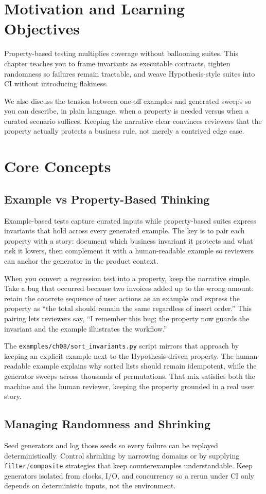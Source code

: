 \section{Motivation and Learning Objectives}
Property-based testing multiplies coverage without ballooning suites. This chapter teaches you to frame invariants as executable contracts, tighten randomness so failures remain tractable, and weave Hypothesis-style suites into CI without introducing flakiness.

We also discuss the tension between one-off examples and generated sweeps so you can describe, in plain language, when a property is needed versus when a curated scenario suffices. Keeping the narrative clear convinces reviewers that the property actually protects a business rule, not merely a contrived edge case.

\section{Core Concepts}
\subsection{Example vs Property-Based Thinking}
Example-based tests capture curated inputs while property-based suites express invariants that hold across every generated example. The key is to pair each property with a story: document which business invariant it protects and what risk it lowers, then complement it with a human-readable example so reviewers can anchor the generator in the product context.

When you convert a regression test into a property, keep the narrative simple. Take a bug that occurred because two invoices added up to the wrong amount: retain the concrete sequence of user actions as an example and express the property as ``the total should remain the same regardless of insert order.'' This pairing lets reviewers say, ``I remember this bug; the property now guards the invariant and the example illustrates the workflow.''

The \texttt{examples/ch08/sort\_invariants.py} script mirrors that approach by keeping an explicit example next to the Hypothesis-driven property. The human-readable example explains why sorted lists should remain idempotent, while the generator sweeps across thousands of permutations. That mix satisfies both the machine and the human reviewer, keeping the property grounded in a real user story.

\subsection{Managing Randomness and Shrinking}
Seed generators and log those seeds so every failure can be replayed deterministically. Control shrinking by narrowing domains or by supplying \texttt{filter}/\texttt{composite} strategies that keep counterexamples understandable. Keep generators isolated from clocks, I/O, and concurrency so a rerun under CI only depends on deterministic inputs, not the environment.

